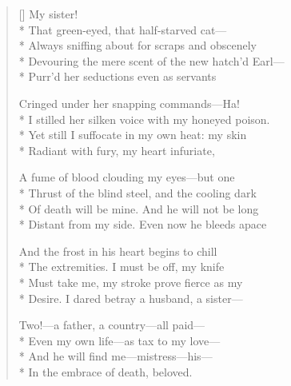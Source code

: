 \label{ch:lear_bm}
\settowidth{\versewidth}{Devouring the mere scent of the new hatch'd Earl---}
\begin{verse}[\versewidth]
 \qquad \qquad My sister!\\*
That green-eyed, that half-starved cat---\\*
Always sniffing about for scraps and obscenely\\*
Devouring the mere scent of the new hatch'd Earl---\\*
Purr'd her seductions even as servants

Cringed under her snapping commands---Ha!\\*
I stilled her silken voice with my honeyed poison.\\*
Yet still I suffocate in my own heat: my skin\\*
Radiant with fury, my heart infuriate,

A fume of blood clouding my eyes---but one\\*
Thrust of the blind steel, and the cooling dark\\*
Of death will be mine.  And he will not be long\\*
Distant from my side.  Even now he bleeds apace

And the frost in his heart begins to chill\\*
The extremities.  I must be off, my knife\\*
Must take me, my stroke prove fierce as my\\*
Desire.  I dared betray a husband, a sister---

Two!---a father, a country---all paid---\\*
Even my own life---as tax to my love---\\*
And he will find me---mistress---his---\\*
In the embrace of death, beloved.
\end{verse}
